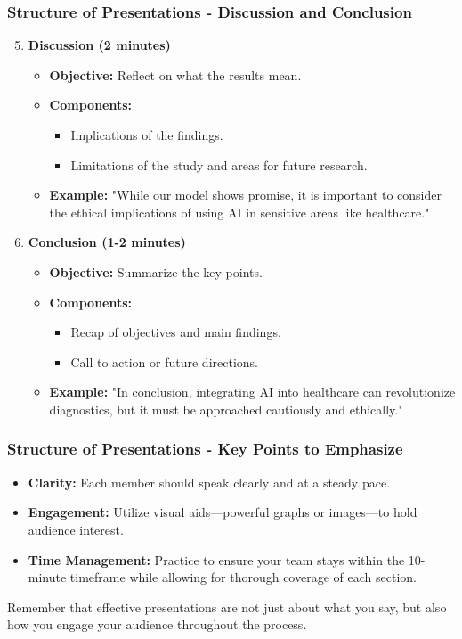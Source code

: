 \documentclass[aspectratio=169]{beamer}
\begin{document}
\begin{frame}[fragile]
    \frametitle{Structure of Presentations - Discussion and Conclusion}
    \begin{enumerate}
        \setcounter{enumi}{4}
        \item \textbf{Discussion (2 minutes)}
        \begin{itemize}
            \item \textbf{Objective:} Reflect on what the results mean.
            \item \textbf{Components:}
            \begin{itemize}
                \item Implications of the findings.
                \item Limitations of the study and areas for future research.
            \end{itemize}
            \item \textbf{Example:} "While our model shows promise, it is important to consider the ethical implications of using AI in sensitive areas like healthcare."
        \end{itemize}

        \item \textbf{Conclusion (1-2 minutes)}
        \begin{itemize}
            \item \textbf{Objective:} Summarize the key points.
            \item \textbf{Components:}
            \begin{itemize}
                \item Recap of objectives and main findings.
                \item Call to action or future directions.
            \end{itemize}
            \item \textbf{Example:} "In conclusion, integrating AI into healthcare can revolutionize diagnostics, but it must be approached cautiously and ethically."
        \end{itemize}
    \end{enumerate}
\end{frame}

\begin{frame}[fragile]
    \frametitle{Structure of Presentations - Key Points to Emphasize}
    \begin{itemize}
        \item \textbf{Clarity:} Each member should speak clearly and at a steady pace.
        \item \textbf{Engagement:} Utilize visual aids—powerful graphs or images—to hold audience interest.
        \item \textbf{Time Management:} Practice to ensure your team stays within the 10-minute timeframe while allowing for thorough coverage of each section.
    \end{itemize}
    Remember that effective presentations are not just about what you say, but also how you engage your audience throughout the process.
\end{frame}
\end{document}
